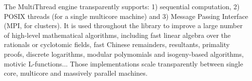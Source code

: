 The MultiThread engine transparently supports: 1) sequential
computation, 2) POSIX threads (for a single multicore machine) and 3)
Message Passing Interface (MPI, for clusters). It is used throughout the
library to improve a large number of high-level mathematical algorithms,
including fast linear algebra over the rationals or cyclotomic fields,
fast Chinese remainders, resultants, primality proofs, discrete
logarithms, modular polymomials and isogeny-based algorithms, motivic
L-functions... Those implementations scale transparently between single
core, multicore and massively parallel machines.
